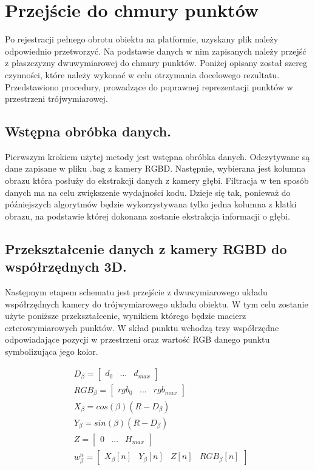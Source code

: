 \section{Przejście do chmury punktów}
Po rejestracji pełnego obrotu obiektu na platformie, uzyskany plik należy odpowiednio przetworzyć. Na podstawie danych w nim zapisanych należy przejść z płaszczyzny dwuwymiarowej do chmury punktów. Poniżej opisany został szereg czynności, które należy wykonać w celu otrzymania docelowego rezultatu. Przedstawiono procedury, prowadzące do poprawnej reprezentacji punktów w przestrzeni trójwymiarowej.
\subsection{Wstępna obróbka danych.}
Pierwszym krokiem użytej metody jest wstępna obróbka danych. Odczytywane są dane zapisane w pliku .bag z kamery RGBD. Następnie, wybierana jest kolumna obrazu która posłuży do ekstrakcji danych z kamery głębi. Filtracja w ten sposób danych ma na celu zwiększenie wydajności kodu. Dzieje się tak, ponieważ do późniejszych algorytmów będzie wykorzystywana tylko jedna kolumna z klatki obrazu, na podstawie której dokonana zostanie ekstrakcja informacji o głębi.

\subsection{Przekształcenie danych z kamery RGBD do współrzędnych 3D.}
Następnym etapem schematu jest przejście z dwuwymiarowego układu współrzędnych kamery do trójwymiarowego układu obiektu. W tym celu zostanie użyte poniższe przekształcenie, wynikiem którego będzie macierz czterowymiarowych punktów. W skład punktu wchodzą trzy współrzędne odpowiadające pozycji w przestrzeni oraz wartość RGB danego punktu symbolizująca jego kolor.

\begin{equation}
    \begin{aligned}
            & D_{\beta}=\begin{bmatrix}d_{0} & \dots & d_{max} \end{bmatrix}  \\
            & RGB_{\beta}=\begin{bmatrix}rgb_{0} & \dots & rgb_{max} \end{bmatrix}  \\
            & X_{\beta}=cos(\beta)(R-D_{\beta})  \\
            & Y_{\beta}=sin(\beta)(R-D_{\beta})  \\
          & Z=\begin{bmatrix} 0 & \dots & H_{max} \end{bmatrix}  \\
          & w_{\beta}^n=\begin{bmatrix} X_{\beta}[n] & Y_{\beta}[n] & Z[n] & RGB_{\beta}[n]\end{bmatrix}  \\
    \end{aligned}
    \label{equ:chmuraPunktow}
\end{equation}

